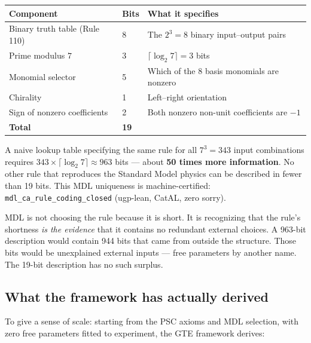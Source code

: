 \documentclass[11pt,a4paper]{article}
\newcommand{\lean}[1]{\texttt{#1}}
\begin{document}
\medskip
\begin{center}
\begin{tabular}{@{}lll@{}}
\toprule
\textbf{Component} & \textbf{Bits} & \textbf{What it specifies} \\
\midrule
Binary truth table (Rule 110) & 8  & The $2^3 = 8$ binary input–output pairs \\
Prime modulus $7$             & 3  & $\lceil \log_2 7 \rceil = 3$ bits \\
Monomial selector             & 5  & Which of the 8 basis monomials are nonzero \\
Chirality                     & 1  & Left–right orientation \\
Sign of nonzero coefficients  & 2  & Both nonzero non-unit coefficients are $-1$ \\
\midrule
\textbf{Total}                & \textbf{19} & \\
\bottomrule
\end{tabular}
\end{center}

\medskip

A naive lookup table specifying the same rule for all $7^3 = 343$ input combinations
requires $343 \times \lceil \log_2 7 \rceil \approx 963$ bits — about \textbf{50 times
more information}.  No other rule that reproduces the Standard Model physics can be
described in fewer than 19 bits.  This MDL uniqueness is machine-certified:
\lean{mdl\_ca\_rule\_coding\_closed} (ugp-lean, CatAL, zero sorry).

MDL is not choosing the rule because it is short.  It is recognizing that the rule's
shortness \emph{is the evidence} that it contains no redundant external choices.
A 963-bit description would contain 944 bits that came from outside the structure.
Those bits would be unexplained external inputs — free parameters by another name.
The 19-bit description has no such surplus.

\subsection{What the framework has actually derived}

To give a sense of scale: starting from the PSC axioms and MDL selection, with zero
free parameters fitted to experiment, the GTE framework derives:
\end{document}
